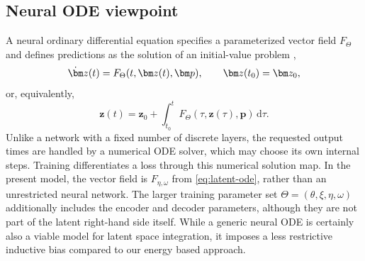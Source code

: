 \documentclass[a4paper,11pt]{article}
\newcommand{\z}{\bm z}
\newcommand{\p}{\bm p}
\begin{document}
\subsection{Neural ODE viewpoint}
A neural ordinary differential equation specifies a parameterized vector field
$F_\Theta$ and defines predictions as the solution of an initial-value problem
\cite{chen2018neural},
\begin{equation}
  \dot\z(t)=F_\Theta(t,\z(t),\p),
  \qquad
  \z(t_0)=\z_0,
  \label{eq:generic_neural_ode}
\end{equation}
or, equivalently,
\begin{equation}
  \z(t)=\z_0+\int_{t_0}^{t}F_\Theta(\tau,\z(\tau),\p)\,\mathrm d\tau.
\end{equation}
Unlike a network with a fixed number of discrete layers, the requested output
times are handled by a numerical ODE solver, which may choose its own internal
steps. Training differentiates a loss through this numerical solution map. In
the present model, the vector field is $F_{\eta,\omega}$ from
\eqref{eq:latent-ode}, rather than an unrestricted neural network. The larger
training parameter set $\Theta=(\theta,\xi,\eta,\omega)$ additionally includes
the encoder and decoder parameters, although they are not part of the latent
right-hand side itself. While a generic neural ODE is certainly also a viable model for latent space integration, it imposes a less restrictive inductive bias compared to our energy based approach.
\end{document}
